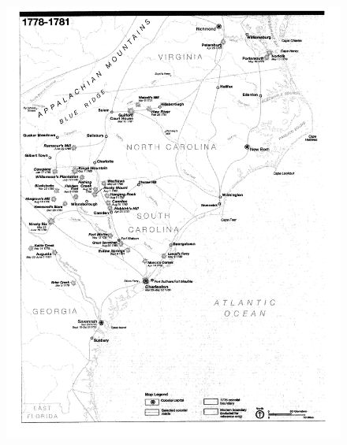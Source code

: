 \lipsum[4]
\begin{figure}[h]
	\singlespacing
	\begin{center}
	  \includegraphics[width=6in]{gfx/rauch_battle_2007_01_p18}
	\end{center}
	\caption{\cite[18]{rauch_battle_2007}}
	\label{cowppark97}
\end{figure}
\lipsum[5]
